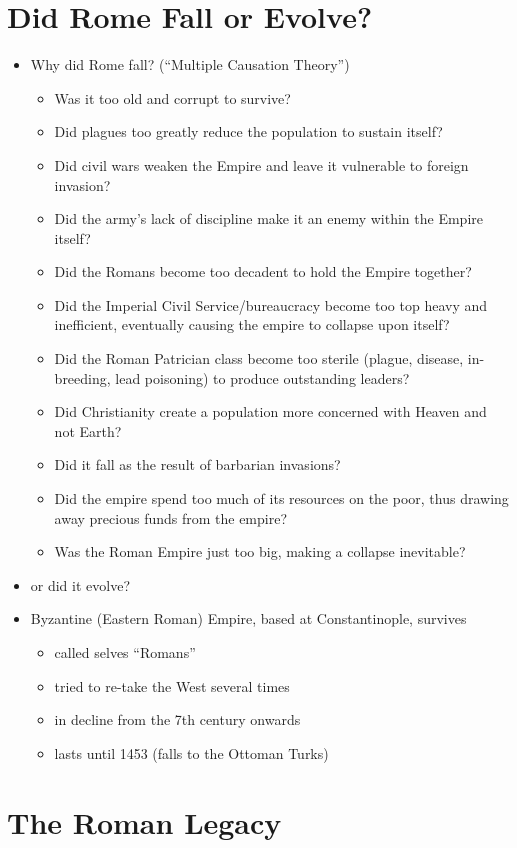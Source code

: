 \documentclass[12pt, twoside]{article}
\begin{document}
\section{Did Rome Fall or Evolve?}
\begin{itemize}
\item Why did Rome fall? (“Multiple Causation Theory”)
	\begin{itemize}
	\item Was it too old and corrupt to survive?
	\item Did plagues too greatly reduce the population to sustain itself? 
	\item Did civil wars weaken the Empire and leave it vulnerable to foreign invasion? 
	\item Did the army’s lack of discipline make it an enemy within the Empire itself? 
	\item Did the Romans become too decadent to hold the Empire together? 
	\item Did the Imperial Civil Service/bureaucracy become too top heavy and inefficient, eventually causing the empire to collapse upon itself? 
	\item Did the Roman Patrician class become too sterile (plague, disease, in-breeding, lead poisoning) to produce outstanding leaders?
	\item Did Christianity create a population more concerned with Heaven and not Earth? 
	\item Did it fall as the result of barbarian invasions? 
	\item Did the empire spend too much of its resources on the poor, thus drawing away precious funds from the empire? 
	\item Was the Roman Empire just too big, making a collapse inevitable? 
	\end{itemize}
\item or did it evolve?
\item Byzantine (Eastern Roman) Empire, based at Constantinople, survives
	\begin{itemize}
	\item called selves “Romans”
	\item tried to re-take the West several times
	\item in decline from the 7th century onwards
	\item lasts until 1453 (falls to the Ottoman Turks)
	\end{itemize}
\end{itemize}

\section{The Roman Legacy}
\end{document}
